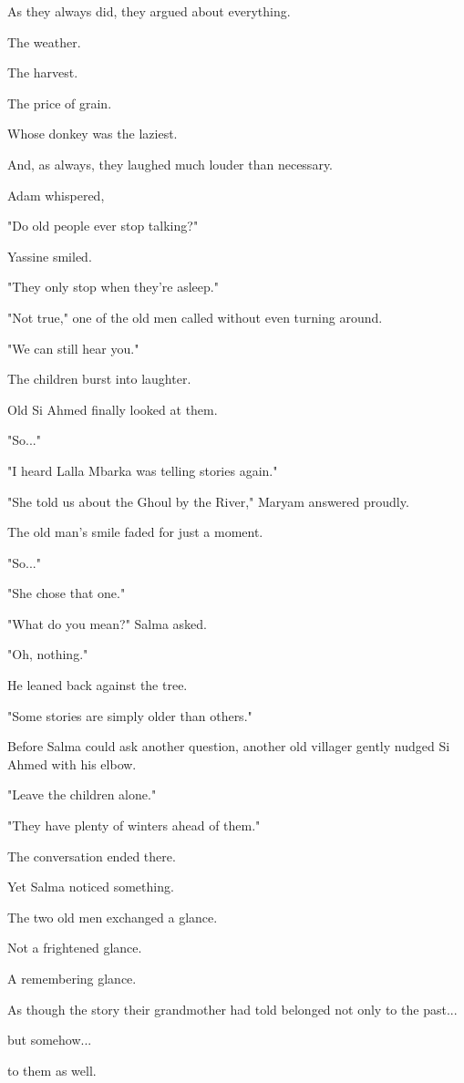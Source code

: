 \documentclass[12pt,openany]{book}
\begin{document}
As they always did, they argued about everything.

The weather.

The harvest.

The price of grain.

Whose donkey was the laziest.

And, as always, they laughed much louder than necessary.

Adam whispered,

"Do old people ever stop talking?"

Yassine smiled.

"They only stop when they're asleep."

"Not true," one of the old men called without even turning around.

"We can still hear you."

The children burst into laughter.

Old Si Ahmed finally looked at them.

"So..."

"I heard Lalla Mbarka was telling stories again."

"She told us about the Ghoul by the River," Maryam answered proudly.

The old man's smile faded for just a moment.

"So..."

"She chose that one."

"What do you mean?" Salma asked.

"Oh, nothing."

He leaned back against the tree.

"Some stories are simply older than others."

Before Salma could ask another question, another old villager gently nudged Si Ahmed with his elbow.

"Leave the children alone."

"They have plenty of winters ahead of them."

The conversation ended there.

Yet Salma noticed something.

The two old men exchanged a glance.

Not a frightened glance.

A remembering glance.

As though the story their grandmother had told belonged not only to the past...

but somehow...

to them as well.
\end{document}
